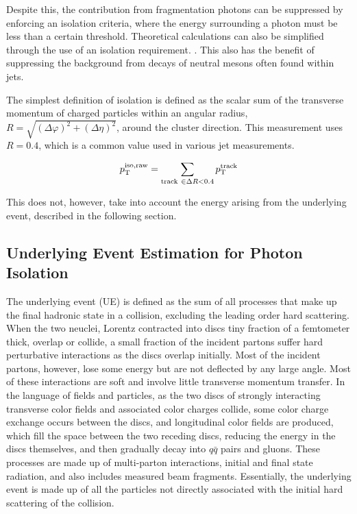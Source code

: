 Despite this, the contribution from fragmentation photons can be suppressed by enforcing an isolation criteria, where the energy surrounding a photon must be less than a certain threshold. 
Theoretical calculations can also be simplified through the use of an isolation requirement. \cite{PhysRevD.82.014015}. This also has the benefit of suppressing the background from decays of neutral mesons often found within jets.

The simplest definition of isolation is defined as the scalar sum of the transverse momentum of charged particles within an angular radius, $R =\sqrt{(\Delta\varphi)^{2} +(\Delta\eta)^{2}  }$, around the cluster direction. This measurement uses $R = 0.4$, which is a common value used in various jet measurements.

\begin{equation}
p_{\mathrm{T}}^\mathrm{iso,raw} = \sum_{\mathrm{track}~\in\Delta R<0.4} p_{\mathrm{T}}^{\mathrm{track}}	
\end{equation}

This does not, however, take into account the energy arising from the underlying event, described in the following section.


\subsection{Underlying Event Estimation for Photon Isolation}
\label{sec:ue_isolation}

The underlying event (UE) is defined as the sum of all processes that make up the final hadronic state in a collision, excluding the leading order hard scattering. When the two neuclei, Lorentz contracted into discs tiny fraction of a femtometer thick, overlap or collide, a small fraction of the incident partons suffer hard perturbative interactions as the discs overlap initially. Most of the incident partons, however, lose some energy but are not deflected by any large angle. Most of these interactions are soft and involve little transverse momentum transfer. In the language of fields and particles, as the two discs of strongly interacting transverse color fields and associated color charges collide, some color charge exchange occurs between the discs, and longitudinal color fields are produced, which fill the space between the two receding discs, reducing the energy in the discs themselves, and then gradually decay into $q\bar{q}$ pairs and gluons. These processes are made up of multi-parton interactions, initial and final state radiation, and also includes measured beam fragments. Essentially, the underlying event is made up of all the particles not directly associated with the initial hard scattering of the collision.

